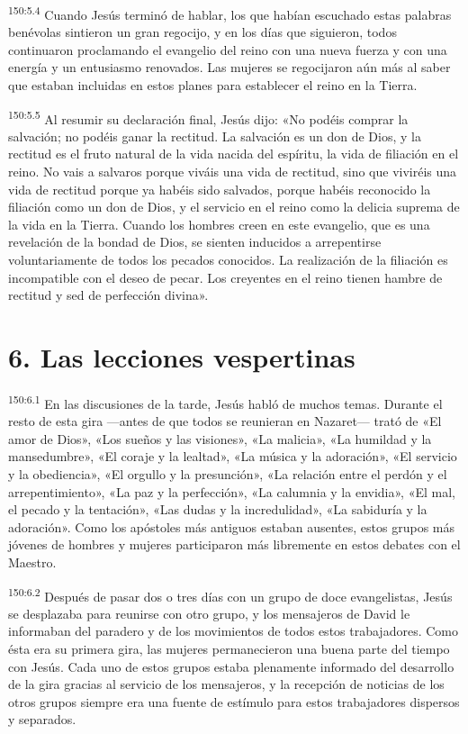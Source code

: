 \par
\textsuperscript{150:5.4} Cuando Jesús terminó de hablar, los que habían escuchado estas palabras benévolas sintieron un gran regocijo, y en los días que siguieron, todos continuaron proclamando el evangelio del reino con una nueva fuerza y con una energía y un entusiasmo renovados. Las mujeres se regocijaron aún más al saber que estaban incluidas en estos planes para establecer el reino en la Tierra.

\par
\textsuperscript{150:5.5} Al resumir su declaración final, Jesús dijo: «No podéis comprar la salvación; no podéis ganar la rectitud. La salvación es un don de Dios, y la rectitud es el fruto natural de la vida nacida del espíritu, la vida de filiación en el reino. No vais a salvaros porque viváis una vida de rectitud, sino que viviréis una vida de rectitud porque ya habéis sido salvados, porque habéis reconocido la filiación como un don de Dios, y el servicio en el reino como la delicia suprema de la vida en la Tierra. Cuando los hombres creen en este evangelio, que es una revelación de la bondad de Dios, se sienten inducidos a arrepentirse voluntariamente de todos los pecados conocidos. La realización de la filiación es incompatible con el deseo de pecar. Los creyentes en el reino tienen hambre de rectitud y sed de perfección divina».

\section*{6. Las lecciones vespertinas}
\par
\textsuperscript{150:6.1} En las discusiones de la tarde, Jesús habló de muchos temas. Durante el resto de esta gira ---antes de que todos se reunieran en Nazaret--- trató de «El amor de Dios», «Los sueños y las visiones», «La malicia», «La humildad y la mansedumbre», «El coraje y la lealtad», «La música y la adoración», «El servicio y la obediencia», «El orgullo y la presunción», «La relación entre el perdón y el arrepentimiento», «La paz y la perfección», «La calumnia y la envidia», «El mal, el pecado y la tentación», «Las dudas y la incredulidad», «La sabiduría y la adoración». Como los apóstoles más antiguos estaban ausentes, estos grupos más jóvenes de hombres y mujeres participaron más libremente en estos debates con el Maestro.

\par
\textsuperscript{150:6.2} Después de pasar dos o tres días con un grupo de doce evangelistas, Jesús se desplazaba para reunirse con otro grupo, y los mensajeros de David le informaban del paradero y de los movimientos de todos estos trabajadores. Como ésta era su primera gira, las mujeres permanecieron una buena parte del tiempo con Jesús. Cada uno de estos grupos estaba plenamente informado del desarrollo de la gira gracias al servicio de los mensajeros, y la recepción de noticias de los otros grupos siempre era una fuente de estímulo para estos trabajadores dispersos y separados.

